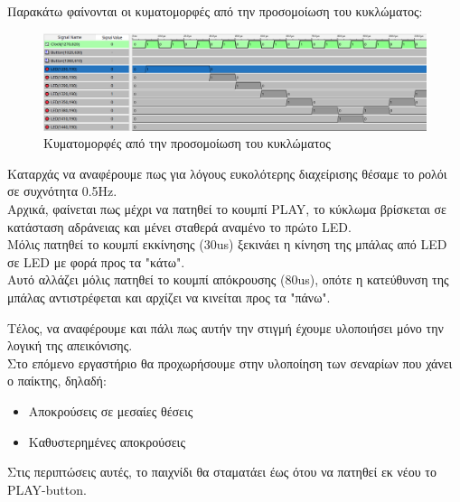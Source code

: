 \documentclass[12pt]{article}
\begin{document}
Παρακάτω φαίνονται οι κυματομορφές από την προσομοίωση του κυκλώματος:

\begin{figure}[H]
    \centering
    \includegraphics[width=1\textwidth]{figures/simulation.png}
    \caption{Κυματομορφές από την προσομοίωση του κυκλώματος}
    \label{fig:waves}
\end{figure}

Καταρχάς να αναφέρουμε πως για λόγους ευκολότερης διαχείρισης θέσαμε το ρολόι σε συχνότητα 0.5Hz. \\
Αρχικά, φαίνεται πως μέχρι να πατηθεί το κουμπί PLAY, το κύκλωμα βρίσκεται σε κατάσταση αδράνειας και μένει σταθερά αναμένο το πρώτο LED. \\
Μόλις πατηθεί το κουμπί εκκίνησης (30us) ξεκινάει η κίνηση της μπάλας από LED σε LED με φορά προς τα "κάτω". \\
Αυτό αλλάζει μόλις πατηθεί το κουμπί απόκρουσης (80us), οπότε η κατεύθυνση της μπάλας αντιστρέφεται και αρχίζει να κινείται προς τα "πάνω". \newline

 Τέλος, να αναφέρουμε και πάλι πως αυτήν την στιγμή έχουμε υλοποιήσει μόνο την λογική της απεικόνισης. \\
 Στο επόμενο εργαστήριο θα προχωρήσουμε στην υλοποίηση των σεναρίων που χάνει ο παίκτης, δηλαδή:
 \begin{itemize}
    \item Αποκρούσεις σε μεσαίες θέσεις
    \item Καθυστερημένες αποκρούσεις
\end{itemize}

Στις περιπτώσεις αυτές, το παιχνίδι θα σταματάει έως ότου να πατηθεί εκ νέου το PLAY-button. \\
\end{document}
